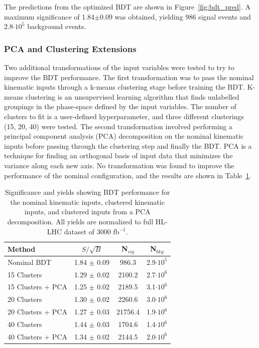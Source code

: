 The predictions from the optimized BDT are shown in Figure~\ref{fig:bdt_pred}. A maximum significance of 1.84$\pm$0.09 was obtained, yielding 986 signal events and 2.8$\cdot 10^5$ background events. 

\subsubsection{PCA and Clustering Extensions}
Two additional transformations of the input variables were tested to try to improve the BDT performance. The first transformation was to pass the nominal kinematic inputs through a k-means clustering stage before training the BDT. K-means clustering is an unsupervised learning algorithm that finds unlabelled groupings in the phase-space defined by the input variables. The number of clusters to fit is a user-defined hyperparameter, and three different clusterings (15, 20, 40) were tested. The second transformation involved performing a principal component analysis (PCA) decomposition on the nominal kinematic inputs before passing through the clustering step and finally the BDT. PCA is a technique for finding an orthogonal basis of input data that minimizes the variance along each new axis. No transformation was found to improve the performance of the nominal configuration, and the results are shown in Table~\ref{tab:bdtPCACluster}.

\begin{table}[h!]
\label{tab:bdtPCACluster}
\begin{center}
    \begin{tabular}{|l|c|c|c|} %
      \hline\hline
      \textbf{Method} & $S/\sqrt{B}$ & N$_{sig}$ & N$_{bkg}$ \\
      \hline
      Nominal BDT & 1.84 $\pm$ 0.09 & 986.3  & 2.9$\cdot 10^5$ \\
      15 Clusters & 1.29 $\pm$ 0.02 & 2100.2 & 2.7$\cdot 10^6$ \\
      15 Clusters + PCA & 1.25 $\pm$ 0.02 & 2189.5 & 3.1$\cdot 10^6$ \\         
      20 Clusters & 1.30 $\pm$ 0.02 & 2260.6 & 3.0$\cdot 10^6$ \\
      20 Clusters + PCA & 1.27 $\pm$ 0.03 & 21756.4 & 1.9$\cdot 10^6$ \\         
      40 Clusters & 1.44 $\pm$ 0.03 & 1704.6 & 1.4$\cdot 10^6$ \\
      40 Clusters + PCA & 1.34 $\pm$ 0.02 & 2144.5 & 2.0$\cdot 10^6$ \\         
      \hline\hline
    \end{tabular}
    \caption{Significance and yields showing BDT performance for the nominal kinematic inputs, clustered kinematic inputs, and clustered inputs from a PCA decomposition. All yields are normalized to full HL-LHC dataset of 3000 fb$^{-1}$.}
    \end{center}
\end{table}



